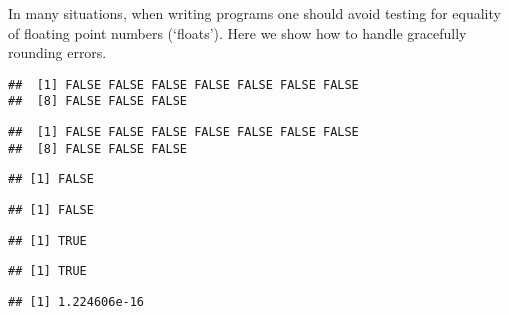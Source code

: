 \documentclass[paper=a4,10pt,div=17,headsepline,BCOR=12mm,twoside,open=right]{scrbook}\usepackage{knitr}
\begin{document}
In many situations, when writing programs one should avoid testing for equality of floating point numbers (`floats'). Here we show how to handle gracefully rounding errors.

\begin{knitrout}\footnotesize
{}\color{fgcolor}\begin{kframe}
\begin{alltt}
 \hlopt{==}  
\end{alltt}
\begin{verbatim}
##  [1] FALSE FALSE FALSE FALSE FALSE FALSE FALSE
##  [8] FALSE FALSE FALSE
\end{verbatim}
\begin{alltt}
 \hlopt{<}  
\end{alltt}
\begin{verbatim}
##  [1] FALSE FALSE FALSE FALSE FALSE FALSE FALSE
##  [8] FALSE FALSE FALSE
\end{verbatim}
\begin{alltt}
 \hlopt{==}  
\end{alltt}
\begin{verbatim}
## [1] FALSE
\end{verbatim}
\begin{alltt}
\hlstd{(} \hlopt{*}  \hlopt{==} 
\end{alltt}
\begin{verbatim}
## [1] FALSE
\end{verbatim}
\begin{alltt}
\hlstd{(} \hlopt{<} 
\end{alltt}
\begin{verbatim}
## [1] TRUE
\end{verbatim}
\begin{alltt}
\hlstd{(}\hlstd{(} \hlopt{*}  \hlopt{<} 
\end{alltt}
\begin{verbatim}
## [1] TRUE
\end{verbatim}
\begin{alltt}
\end{alltt}
\begin{verbatim}
## [1] 1.224606e-16
\end{verbatim}

\end{kframe}
\end{knitrout}
\end{document}
